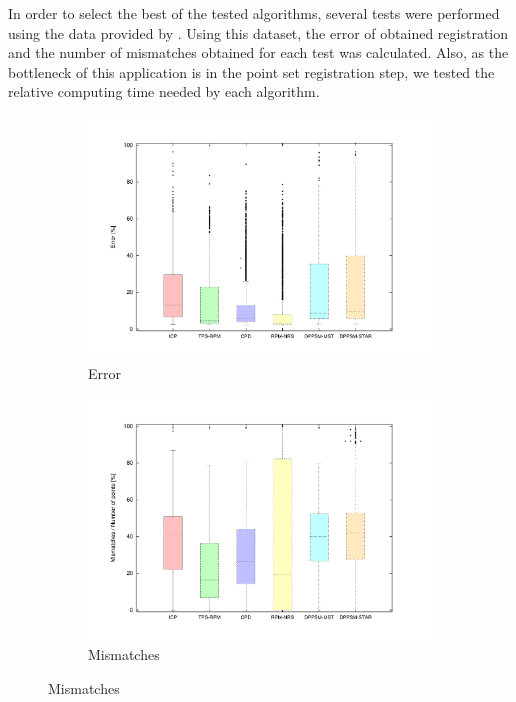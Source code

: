 In order to select the best of the tested algorithms, several tests were performed using the data provided by 
\cite{chui2000new}. Using this dataset, the error of obtained registration and the number of mismatches obtained for 
each test was calculated. Also, as the bottleneck of this application is in the point set registration step, we 
tested the relative computing time needed by each algorithm.

\begin{figure}[t]
        \centering
        \begin{subfigure}[b]{0.45\columnwidth}
                \centering
                \includegraphics[width=\textwidth, trim=50 40 80 50,clip]{fig18.pdf}
                \caption{Error}
                \label{fig:cp02_errorChart}
        \end{subfigure}%
        \begin{subfigure}[b]{0.45\columnwidth}
                \centering
                \includegraphics[width=\textwidth, trim=50 40 80 50,clip]{fig19.pdf}
                \caption{Mismatches}
                \label{fig:cp02_mismatchesChart}
        \end{subfigure}%
        

\end{figure}
